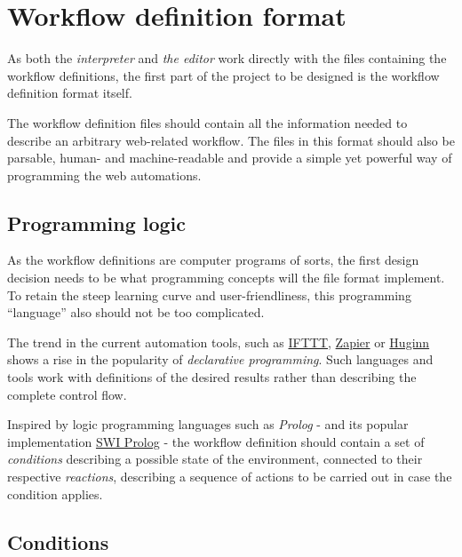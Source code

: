 \section{Workflow definition format}

As both the \textit{interpreter} and \textit{the editor} work directly with the files containing the workflow definitions, the first part of the project to be designed is the workflow definition format itself.

The workflow definition files should contain all the information needed to describe an arbitrary web-related workflow. 
The files in this format should also be parsable, human- and machine-readable and provide a simple yet powerful way of programming the web automations.

\subsection{Programming logic}

As the workflow definitions are computer programs of sorts, the first design decision needs to be what programming concepts will the file format implement.
To retain the steep learning curve and user-friendliness, this programming ``language'' also should not be too complicated.


The trend in the current automation tools, such as \href{https://ifttt.com/}{IFTTT}, \href{https://zapier.com/}{Zapier} 
or \href{https://github.com/huginn/huginn}{Huginn} shows a rise in the popularity of \textit{declarative programming}.
Such languages and tools work with definitions of the desired results rather than describing the complete control flow. 

Inspired by logic programming languages such as \textit{Prolog} - and its popular implementation \href{https://www.swi-prolog.org/}{SWI Prolog} - 
the workflow definition should contain a set of \textit{conditions} describing a possible state of the environment, connected to their respective \textit{reactions}, 
describing a sequence of actions to be carried out in case the condition applies.


\subsection{Conditions}
\label{conditions}

